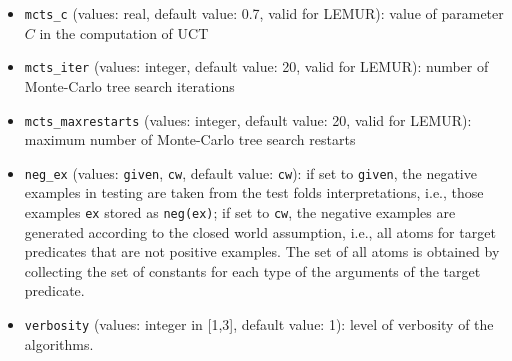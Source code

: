 \begin{itemize}
\item \verb|mcts_c|  (values: real, default value: 0.7, valid for LEMUR): value of parameter $C$ in the computation of UCT
\item \verb|mcts_iter|  (values: integer, default value: 20, valid for LEMUR): number of Monte-Carlo tree search iterations
\item \verb|mcts_maxrestarts|  (values: integer, default value: 20, valid for LEMUR): maximum number of Monte-Carlo tree search restarts
\item \verb|neg_ex| (values:  \verb|given|, \verb|cw|, default value: \verb|cw|): if  set to \verb|given|, the negative examples in testing
are taken from the test folds interpretations, i.e., those examples \verb|ex| stored as \verb|neg(ex)|; if set to \verb|cw|, the negative examples are generated according to the closed world assumption, i.e., all atoms for target predicates that are not positive examples. The set of all atoms is obtained by collecting the set of constants for each type of the arguments of the target predicate.
\item \verb|verbosity| (values: integer in [1,3], default value: 1): level of verbosity of the algorithms.
\end{itemize}
